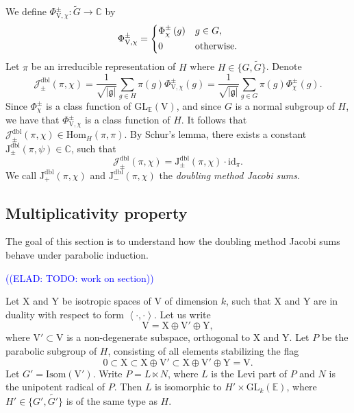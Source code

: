 \documentclass[12pt, reqno]{amsart}
\theoremstyle{definition}
\theoremstyle{definition}
\theoremstyle{definition}
\newcommand{\cComplex}{\mathbb{C}}
\newcommand{\Hom}{\mathrm{Hom}}
\newcommand{\idmap}{\mathrm{id}}
\newcommand{\sizeof}[1]{\left|#1\right|}
\newcommand{\hermitianSpace}{\mathrm{V}}
\newcommand{\xIsotropic}{\mathrm{X}}
\newcommand{\yIsotropic}{\mathrm{Y}}
\newcommand{\innerproduct}[2]{\left\langle #1,#2\right\rangle}
\newcommand{\fieldCharacter}{\psi}
\newcommand{\GL}{\mathrm{GL}}
\newcommand{\GroupExtension}[1]{\widetilde{#1}}
\newcommand{\quadraticExtension}{\mathbb{E}}
\newcommand{\dblJacobiSum}[2]{\mathcal{J}_{\pm}^{\mathrm{dbl}}\left(#1, #2\right)}
\newcommand{\genJacobiKernel}[1]{\Phi^{\pm}_{#1}}
\newcommand{\genHermitianJacobiKernel}[2]{\Phi^{\pm}_{#1,#2}}
\newcommand{\dblJacobiSumScalar}[2]{\mathrm{J}_{\pm}^{\mathrm{dbl}}\left(#1, #2\right)}
\newcommand{\posDblJacobiSumScalar}[2]{\mathrm{J}_{+}^{\mathrm{dbl}}\left(#1, #2\right)}
\newcommand{\negDblJacobiSumScalar}[2]{\mathrm{J}_{-}^{\mathrm{dbl}}\left(#1, #2\right)}
\newcommand{\IsometryGroup}{\mathrm{Isom}}
\newcommand{\lieAlgebra}{\mathfrak{g}}
\newcommand{\elad}[1]{\textcolor{blue}{\sffamily ((ELAD: #1))}}
\begin{document}
We define $\genHermitianJacobiKernel{\hermitianSpace}{\chi} \colon \tilde{G} \to \cComplex$ by $$\genHermitianJacobiKernel{\hermitianSpace}{\chi} =
	\begin{dcases}
		\genJacobiKernel{\chi}\left(g\right) & g \in G,\\
		0 & \text{otherwise.}
	\end{dcases}$$
Let $\pi$ be an irreducible representation of $H$ where $H \in \{G, \GroupExtension{G}\}$. Denote $$\dblJacobiSum{\pi}{\chi} = \frac{1}{\sqrt{\sizeof{\lieAlgebra}}} \sum_{g \in H} \pi\left(g\right) \genHermitianJacobiKernel{\hermitianSpace}{\chi}\left(g\right) = \frac{1}{\sqrt{\sizeof{\lieAlgebra}}} \sum_{g \in G} \pi\left(g\right) \genJacobiKernel{\chi}\left(g\right).$$
Since $\genJacobiKernel{\chi}$ is a class function of $\GL_{\quadraticExtension}\left(\hermitianSpace\right)$, and since $G$ is a normal subgroup of $H$, we have that $\genHermitianJacobiKernel{\hermitianSpace}{\chi}$ is a class function of $H$. It follows that $\dblJacobiSum{\pi}{\chi} \in \Hom_{H}\left(\pi, \pi\right)$. By Schur's lemma, there exists a constant $\dblJacobiSumScalar{\pi}{\fieldCharacter} \in \cComplex$, such that $$\dblJacobiSum{\pi}{\chi} = \dblJacobiSumScalar{\pi}{\chi} \cdot \idmap_\pi.$$
We call $\posDblJacobiSumScalar{\pi}{\chi}$ and $\negDblJacobiSumScalar{\pi}{\chi}$ the \emph{doubling method Jacobi sums}.

\subsection{Multiplicativity property}
The goal of this section is to understand how the doubling method Jacobi sums behave under parabolic induction.

\elad{TODO: work on section}

Let $\xIsotropic$ and $\yIsotropic$ be isotropic spaces of $\hermitianSpace$ of dimension $k$, such that $\xIsotropic$ and $\yIsotropic$ are in duality with respect to form $\innerproduct{\cdot}{\cdot}$. Let us write $$\hermitianSpace = \xIsotropic \oplus \hermitianSpace' \oplus \yIsotropic,$$
where $\hermitianSpace' \subset \hermitianSpace$ is a non-degenerate subspace, orthogonal to $\xIsotropic$ and $\yIsotropic$. Let $P$ be the parabolic subgroup of $H$, consisting of all elements stabilizing the flag $$0 \subset \xIsotropic \subset \xIsotropic \oplus \hermitianSpace' \subset \xIsotropic \oplus \hermitianSpace' \oplus \yIsotropic = \hermitianSpace.$$
Let $G' = \IsometryGroup\left(\hermitianSpace'\right)$. Write $P = L \ltimes N$, where $L$ is the Levi part of $P$ and $N$ is the unipotent radical of $P$. Then $L$ is isomorphic to $H' \times \GL_k\left(\quadraticExtension\right)$, where $H' \in \{G',\GroupExtension{G'}\}$ is of the same type as $H$. 
\end{document}
